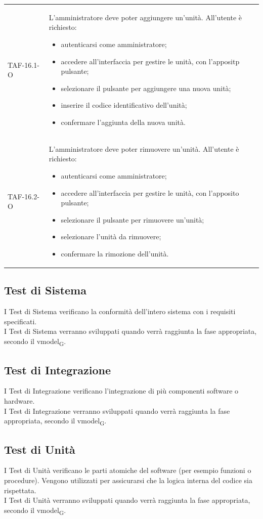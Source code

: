 \begin{longtable}{ >{\centering}p{} >{}p{}
		>{\centering}p{}}
	TAF-16.1-O & L'amministratore deve poter aggiungere un'unità. \newline All'utente è richiesto: \begin{itemize} \item autenticarsi come amministratore; \item accedere all'interfaccia per gestire le unità, con l'appositp pulsante; \item selezionare il pulsante per aggiungere una nuova unità; \item inserire il codice identificativo dell'unità; \item confermare l'aggiunta della nuova unità.\end{itemize} & 0\tabularnewline
	
	TAF-16.2-O & L'amministratore deve poter rimuovere un'unità. \newline All'utente è richiesto: \begin{itemize} \item autenticarsi come amministratore; \item accedere all'interfaccia per gestire le unità, con l'apposito pulsante; \item selezionare il pulsante per rimuovere un'unità; \item selezionare l'unità da rimuovere; \item confermare la rimozione dell'unità.\end{itemize} & 0\tabularnewline
	
	
	
\end{longtable}

\subsection{Test di Sistema}
I Test di Sistema verificano la conformità dell'intero sistema con i requisiti specificati.\\I Test di Sistema verranno sviluppati quando verrà raggiunta la fase appropriata, secondo il \gls{vmodel}\textsubscript{G}.

\subsection{Test di Integrazione}
I Test di Integrazione verificano l'integrazione di più componenti software o hardware.\\I Test di Integrazione verranno sviluppati quando verrà raggiunta la fase appropriata, secondo il \gls{vmodel}\textsubscript{G}.

\subsection{Test di Unità}
I Test di Unità verificano le parti atomiche del software (per esempio funzioni o procedure). Vengono utilizzati per assicurarsi che la logica interna del codice sia rispettata.\\I Test di Unità verranno sviluppati quando verrà raggiunta la fase appropriata, secondo il \gls{vmodel}\textsubscript{G}.
